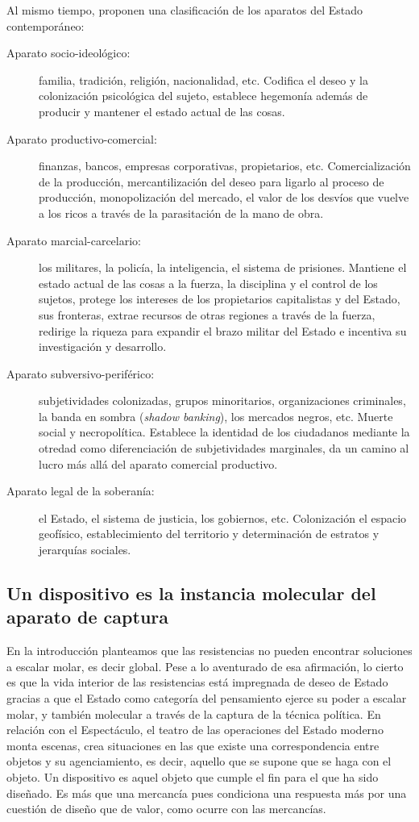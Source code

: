 Al mismo tiempo, proponen una clasificación de los aparatos del Estado contemporáneo:

\begin{description}
  \item[Aparato socio-ideológico:] familia, tradición, religión, nacionalidad, etc. Codifica el deseo y la colonización psicológica del sujeto, establece hegemonía además de producir y mantener el estado actual de las cosas.
  \item[Aparato productivo-comercial:] finanzas, bancos, empresas corporativas, propietarios, etc. Comercialización de la producción, mercantilización del deseo para ligarlo al proceso de producción, monopolización del mercado, el valor de los desvíos que vuelve a los ricos a través de la parasitación de la mano de obra.
  \item[Aparato marcial-carcelario:] los militares, la policía, la inteligencia, el sistema de prisiones. Mantiene el estado actual de las cosas a la fuerza, la disciplina y el control de los sujetos, protege los intereses de los propietarios capitalistas y del Estado, sus fronteras, extrae recursos de otras regiones a través de la fuerza, redirige la riqueza para expandir el brazo militar del Estado e incentiva su investigación y desarrollo.
  \item[Aparato subversivo-periférico:] subjetividades colonizadas, grupos minoritarios, organizaciones criminales, la banda en sombra (\emph{shadow banking}), los mercados negros, etc. Muerte social y necropolítica. Establece la identidad de los ciudadanos mediante la otredad como diferenciación de subjetividades marginales, da un camino al lucro más allá del aparato comercial productivo.
  \item[Aparato legal de la soberanía:] el Estado, el sistema de justicia, los gobiernos, etc. Colonización el espacio geofísico, establecimiento del territorio y determinación de estratos y jerarquías sociales.
\end{description}

\subsection{Un dispositivo es la instancia molecular del aparato de captura}
\label{sub:un-dispositivo-es}

En la introducción planteamos que las resistencias no pueden encontrar soluciones a escalar molar, es decir global. Pese a lo aventurado de esa afirmación, lo cierto es que la vida interior de las resistencias está impregnada de deseo de Estado gracias a que el Estado como categoría del pensamiento ejerce su poder a escalar molar, y también molecular a través de la captura de la técnica política. En relación con el Espectáculo, el teatro de las operaciones del Estado moderno monta escenas, crea situaciones en las que existe una correspondencia entre objetos y su agenciamiento, es decir, aquello que se supone que se haga con el objeto. Un dispositivo es aquel objeto que cumple el fin para el que ha sido diseñado. Es más que una mercancía pues condiciona una respuesta más por una cuestión de diseño que de valor, como ocurre con las mercancías.

